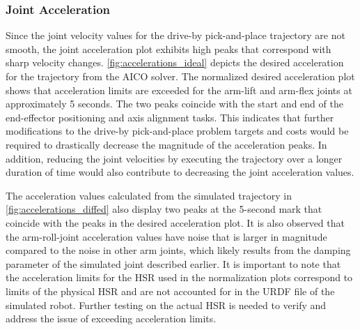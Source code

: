 \documentclass[12pt]{article}
\begin{document}
        \subsubsection{Joint Acceleration}
            Since the joint velocity values for the drive-by pick-and-place trajectory are not smooth, the joint acceleration plot exhibits high peaks that correspond with sharp velocity changes. \cref{fig:accelerations_ideal} depicts the desired acceleration for the trajectory from the AICO solver. The normalized desired acceleration plot shows that acceleration limits are exceeded for the arm-lift and arm-flex joints at approximately 5 seconds. The two peaks coincide with the start and end of the end-effector positioning and axis alignment tasks. This indicates that further modifications to the drive-by pick-and-place problem targets and costs would be required to drastically decrease the magnitude of the acceleration peaks. In addition, reducing the joint velocities by executing the trajectory over a longer duration of time would also contribute to decreasing the joint acceleration values.
            \par The acceleration values calculated from the simulated trajectory in \cref{fig:accelerations_diffed} also display two peaks at the 5-second mark that coincide with the peaks in the desired acceleration plot. It is also observed that the arm-roll-joint acceleration values have noise that is larger in magnitude compared to the noise in other arm joints, which likely results from the damping parameter of the simulated joint described earlier. It is important to note that the acceleration limits for the HSR used in the normalization plots correspond to limits of the physical HSR and are not accounted for in the URDF file of the simulated robot. Further testing on the actual HSR is needed to verify and address the issue of exceeding acceleration limits.
\end{document}
